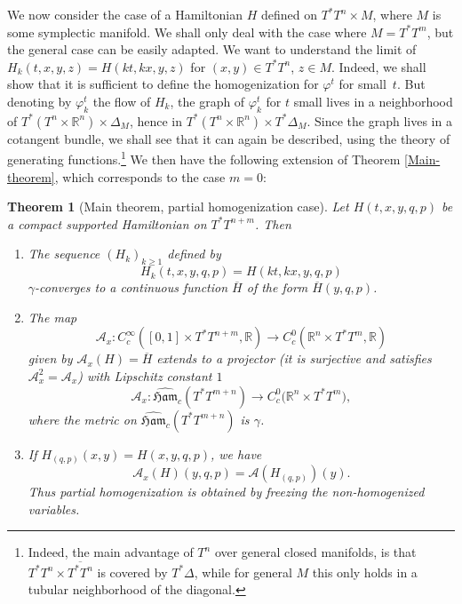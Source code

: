 \documentclass[JEP,XML,SOM,NoFloatCountersInSection,Unicode,published]{cedram}
\numberwithin{equation}{section}
\newcommand {\Ham}{{\mathfrak {Ham}}}
\newcommand{\gclHamc}[1]{\widehat{\Ham}_c(#1)}
\theoremstyle{plain}
\newtheorem{theorem}{Theorem}[section]
\theoremstyle{definition}
\theoremstyle{remark}
\begin{document}
We now consider the case of a Hamiltonian $H$ defined on $T^*T^n\times M$, where $M$ is some symplectic manifold. We shall only deal with the case where $M=T^*T^m$, but the general case can be easily adapted. We want to understand the limit of $H_k(t,x,y,z)=H(kt, kx,y,z)$ for $(x,y)\in T^*T^n$, $z \in M$.
Indeed, we shall show that it is sufficient to define the homogenization for $\varphi^t$ for small~$t$. But denoting by $\varphi_k^t$ the flow of $H_k$, the graph of $\varphi_{k}^t$ for $t$ small lives in a neighborhood of $T^*(T^n\times {\mathbb R}^n)\times \Delta_{M}$, hence in
$T^*(T^n\times {\mathbb R}^n)\times T^*\Delta_{M}$. Since the graph lives in a cotangent bundle, we shall see that it can again be described, using the theory of generating functions.\footnote{Indeed, the main advantage of $T^{n}$ over general closed manifolds, is that $T^{*}T^{n}\times \overline {T^{*}T^{n}}$ is covered by $T^{*}\Delta$, while for general $M$ this only holds in a tubular neighborhood of the diagonal.}
We then have the following extension of Theorem \ref{Main-theorem}, which corresponds to the case $m=0$:
\begin{theorem} [Main theorem, partial homogenization case] \label{Thm-4.5}
Let $H(t,x,y,q,p)$ be a compact supported Hamiltonian on $T^*T^{n+m}$.
Then \begin{enumerate}
\item \label{Thm-4.5-1} The sequence $(H_{k})_{k\geq 1}$ defined by
\[
H_k(t,x,y,q,p)=H(kt,kx,y,q,p)
\]
$\gamma$-converges to
a continuous function $\overline H$ of the form $\overline H (y,q,p)$.
\item \label{Thm-4.5-2}The map
\[
{\mathcal A}_x: C_{c}^{\infty} ([0,1]\times T^{*} T^{n+m}, \mathbb{R}) \to C_c^{0}
(\mathbb{R}^{n}\times T^*T^m,\mathbb{R})
\]
given by $\mathcal{A}_{x}(H) = \overline{H}$ extends to a projector (\ie it is surjective and satisfies ${\mathcal A}_{x}^2= {\mathcal A}_{x}$) with Lipschitz constant $1$
\[
\mathcal{A}_x: \gclHamc {T^*T^{m+n}}\to
C_c^0({\mathbb{R}^{n} \times T^*T^m)},
\]
where the metric on $\gclHamc {T^*T^{m+n}}$ is $\gamma$.
\item \label{Thm-4.5-3} If $H_{(q,p)}(x,y)=H(x,y,q,p)$, we have
\[
\mathcal {A}_{x}(H) (y,q,p)= \mathcal {A}(H_{(q,p)})(y).
\]
Thus partial homogenization is obtained by freezing the non-homogenized variables.
\end{enumerate}
\end{theorem}
\end{document}

